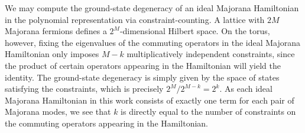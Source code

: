 \documentclass[aps,twocolumn,preprintnumbers,floatfix,showpacs,prx]{revtex4-1}
\begin{document}
%
%
We may compute the ground-state degeneracy of an ideal Majorana Hamiltonian
in the polynomial representation via constraint-counting.
A lattice with $2M$ Majorana fermions defines a $2^M$-dimensional Hilbert space. On the torus, however, fixing the eigenvalues of the commuting operators in the ideal Majorana Hamiltonian only imposes $M - k$ multiplicatively independent constraints, since the product of certain operators appearing in the Hamiltonian will yield the identity. 
The ground-state degeneracy is simply given by the space of states satisfying the constraints, which is precisely $2^{M}/2^{M-k} = 2^k$.  
As each ideal Majorana Hamiltonian in this work consists of exactly one term for each pair of Majorana modes, we see that $k$ is directly equal to the number of constraints on the commuting operators appearing in the Hamiltonian. %
\end{document}
